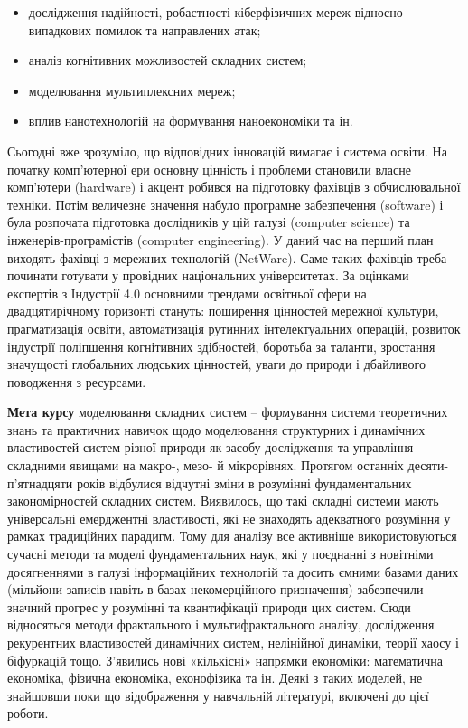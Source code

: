 \documentclass[
  letterpaper,
]{report}
\providecommand{\tightlist}{%
  \setlength{\itemsep}{0pt}\setlength{\parskip}{0pt}}\usepackage{longtable,booktabs,array}
\begin{document}
\begin{itemize}
\tightlist
\item
  дослідження надійності, робастності кіберфізичних мереж відносно
  випадкових помилок та направлених атак;
\item
  аналіз когнітивних можливостей складних систем;
\item
  моделювання мультиплексних мереж;
\item
  вплив нанотехнологій на формування наноекономіки та ін.
\end{itemize}

Сьогодні вже зрозуміло, що відповідних інновацій вимагає і система
освіти. На початку комп'ютерної ери основну цінність і проблеми
становили власне комп'ютери (hardware) і акцент робився на підготовку
фахівців з обчислювальної техніки. Потім величезне значення набуло
програмне забезпечення (software) і була розпочата підготовка
дослідників у цій галузі (computer science) та інженерів-програмістів
(computer engineering). У даний час на перший план виходять фахівці з
мережних технологій (NetWare). Саме таких фахівців треба починати
готувати у провідних національних університетах. За оцінками експертів з
Індустрії 4.0 основними трендами освітньої сфери на двадцятирічному
горизонті стануть: поширення цінностей мережної культури, прагматизація
освіти, автоматизація рутинних інтелектуальних операцій, розвиток
індустрії поліпшення когнітивних здібностей, боротьба за таланти,
зростання значущості глобальних людських цінностей, уваги до природи і
дбайливого поводження з ресурсами.

\textbf{Мета курсу} моделювання складних систем -- формування системи
теоретичних знань та практичних навичок щодо моделювання структурних і
динамічних властивостей систем різної природи як засобу дослідження та
управління складними явищами на макро-, мезо- й мікрорівнях. Протягом
останніх десяти-п'ятнадцяти років відбулися відчутні зміни в розумінні
фундаментальних закономірностей складних систем. Виявилось, що такі
складні системи мають універсальні емерджентні властивості, які не
знаходять адекватного розуміння у рамках традиційних парадигм. Тому для
аналізу все активніше використовуються сучасні методи та моделі
фундаментальних наук, які у поєднанні з новітніми досягненнями в галузі
інформаційних технологій та досить ємними базами даних (мільйони записів
навіть в базах некомерційного призначення) забезпечили значний прогрес у
розумінні та квантифікації природи цих систем. Сюди відносяться методи
фрактального і мультифрактального аналізу, дослідження рекурентних
властивостей динамічних систем, нелінійної динаміки, теорії хаосу і
біфуркацій тощо. З'явились нові «кількісні» напрямки економіки:
математична економіка, фізична економіка, еконофізика та ін. Деякі з
таких моделей, не знайшовши поки що відображення у навчальній
літературі, включені до цієї роботи.
\end{document}
